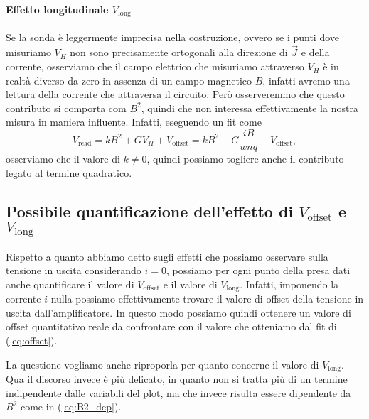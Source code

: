 \documentclass[fleqn,varvw,11pt,tightenlines]{memo}
\begin{document}
\paragraph{Effetto longitudinale $V_\text{long}$} Se la sonda è leggermente imprecisa nella costruzione, ovvero se i punti dove misuriamo $V_H$ non sono precisamente ortogonali alla direzione di $\vec{J}$ e della corrente, osserviamo che il campo elettrico che misuriamo attraverso $V_H$ è in realtà diverso da zero in assenza di un campo magnetico $B$, infatti avremo una lettura della corrente che attraversa il circuito. Però osserveremmo che questo contributo si comporta com $B^2$, quindi che non interessa effettivamente la nostra misura in maniera influente. Infatti, eseguendo un fit come \begin{equation}
    V_\text{read} = kB^2 +  GV_H + V_\text{offset} = kB^2 + G\frac{iB}{wnq} + V_\text{offset},\label{eq:B2_dep}
\end{equation} osserviamo che il valore di $k\neq0$, quindi possiamo togliere anche il contributo legato al termine quadratico. 

\subsection{Possibile quantificazione dell'effetto di $V_\text{offset}$ e $V_\text{long}$}
 Rispetto a quanto abbiamo detto sugli effetti che possiamo osservare sulla tensione in uscita considerando $i=0$, possiamo per ogni punto della presa dati anche quantificare il valore di $V_\text{offset}$ e il valore di $V_\text{long}$. 
Infatti, imponendo la corrente $i$ nulla possiamo effettivamente trovare il valore di offset della tensione in uscita dall'amplificatore. In questo modo possiamo quindi ottenere un valore di offset quantitativo reale da confrontare con il valore che otteniamo dal fit di (\ref{eq:offset}). 

La questione vogliamo anche riproporla per quanto concerne il valore di $V_\text{long}$. Qua il discorso invece è più delicato, in quanto non si tratta più di un termine indipendente dalle variabili del plot, ma che invece risulta essere dipendente da $B^2$ come in (\ref{eq:B2_dep}).
\end{document}
